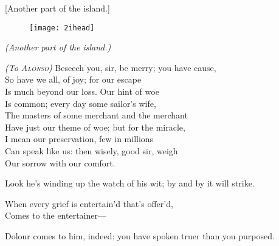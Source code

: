 
[Another part of the island.]

\begin{figure}[t]
	\centering
	\texttt{[image: 2ihead]}
\end{figure}


\vspace{\textsink}
\textit{(Another part of the island.)}\centering


\begin{verse_speech}[Gonzalo] 
\textit{(To \textsc{Alonso})} 
Beseech you, sir, be merry; you have cause,\\
So have we all, of joy; for our escape\\
Is much beyond our loss. Our hint of woe\\
Is common; every day some sailor's wife,\\
The masters of some merchant and the merchant\\
Have just our theme of woe; but for the miracle,\\
I mean our preservation, few in millions\\
Can speak like us: then wisely, good sir, weigh\\
Our sorrow with our comfort.
\end{verse_speech}

\begin{prose_speech}[Sebastian] Look he's winding up the watch of his wit; by and by it will strike.
\end{prose_speech}

\begin{verse_speech}[Gonzalo] When every grief is entertain'd that's offer'd,\\
Comes to the entertainer—
\end{verse_speech}

\begin{prose_speech}[Gonzalo] Dolour comes to him, indeed: you have spoken truer than you purposed.
\end{prose_speech}

